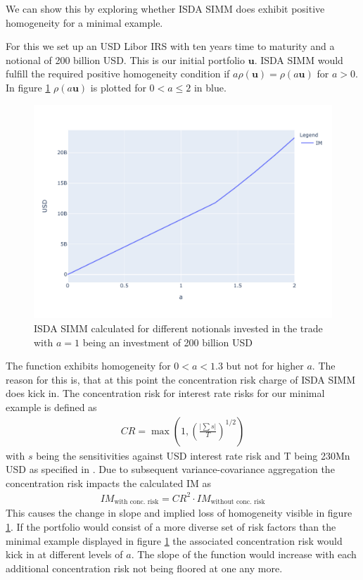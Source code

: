 \documentclass[../Thesis_AHoecherl.tex]{subfiles}
\begin{document}
    We can show this by exploring whether \gls{ISDA SIMM} does exhibit positive homogeneity for a minimal example.
    
    For this we set up an USD Libor \gls{IRS} with ten years time to maturity and a notional of 200 billion USD. This is our initial portfolio $\mathbf{u}$. \gls{ISDA SIMM} would fulfill the required positive homogeneity condition if $a \rho(\mathbf{u}) = \rho(a \mathbf{u})$ for $a>0$. In figure \ref{fig:homogeneity of ISDA SIMM} $\rho(a\mathbf{u})$ is plotted for $0<a\leq 2$ in blue. 
    \begin{figure}
        \centering
        \includegraphics{Graphics/ISDA_SIMM_homogenity.pdf}
        \caption[Homogeneity of ISDA SIMM]{ISDA SIMM calculated for different notionals invested in the trade with $a=1$ being an investment of 200 billion USD}
        \label{fig:homogeneity of ISDA SIMM}
    \end{figure}
    The function exhibits homogeneity for $0<a<1.3$ but not for higher $a$. 
    The reason for this is, that at this point the concentration risk charge of \gls{ISDA SIMM} does kick in.
    The concentration risk for interest rate risks for our minimal example is defined as \cite[Article 7.b]{SIMM}
    \begin{align*}
        CR = \max\left(1,\left(\frac{\lvert\sum{s}\rvert}{T}\right)^{1/2}\right)
    \end{align*}
    with $s$ being the sensitivities against USD interest rate risk and T being 230Mn USD as specified in \cite[Article 74]{SIMM}. Due to subsequent variance-covariance aggregation the concentration risk impacts the calculated \gls{IM} as
    \begin{align*}
        IM_{\text{with conc. risk}} = CR^2 \cdot IM_{\text{without conc. risk}}
    \end{align*}
    This causes the change in slope and implied loss of homogeneity visible in figure \ref{fig:homogeneity of ISDA SIMM}. If the portfolio would consist of a more diverse set of risk factors than the minimal example displayed in figure \ref{fig:homogeneity of ISDA SIMM} the associated concentration risk would kick in at different levels of $a$.
    The slope of the function would increase with each additional concentration risk not being floored at one any more. 
    
\end{document}
